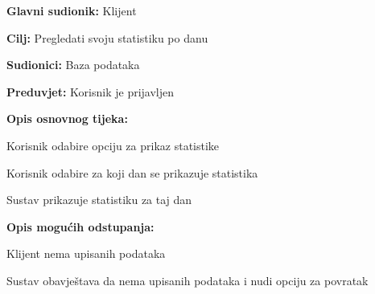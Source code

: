 					\noindent {}
					\begin{packed_item}
						
						\item \textbf{Glavni sudionik:} Klijent
						\item  \textbf{Cilj:} Pregledati svoju statistiku po danu
						\item  \textbf{Sudionici:} Baza podataka
						\item  \textbf{Preduvjet:} Korisnik je prijavljen
						\item  \textbf{Opis osnovnog tijeka:}
						
						\item[] \begin{packed_enum}
							
							\item Korisnik odabire opciju za prikaz statistike
							\item Korisnik odabire za koji dan se prikazuje statistika
							\item Sustav prikazuje statistiku za taj dan
							
						\end{packed_enum}
					
						\item  \textbf{Opis mogućih odstupanja:}
						
						\item[] \begin{packed_item}
							
							\item[3.a] Klijent nema upisanih podataka 
							\item[] \begin{packed_enum}
								
								\item Sustav obavještava da nema upisanih podataka i nudi opciju za povratak
								
							\end{packed_enum}
							
						\end{packed_item}
						
					\end{packed_item}
			
